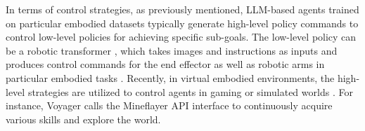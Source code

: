 In terms of control strategies, as previously mentioned, LLM-based agents trained on particular embodied datasets typically generate high-level policy commands to control low-level policies for achieving specific sub-goals. The low-level policy can be a robotic transformer \cite{DBLP:conf/icml/DriessXSLCIWTVY23, DBLP:journals/corr/abs-2212-06817, DBLP:journals/corr/abs-2307-15818}, which takes images and instructions as inputs and produces control commands for the end effector as well as robotic arms in particular embodied tasks \cite{DBLP:conf/corl/IchterBCFHHHIIJ22}. Recently, in virtual embodied environments, the high-level strategies are utilized to control agents in gaming \cite{DBLP:journals/corr/abs-2305-17144,DBLP:journals/corr/abs-2302-01560, DBLP:journals/corr/abs-2305-16291, DBLP:conf/nips/FanWJMYZTHZA22} or simulated worlds \cite{DBLP:journals/corr/abs-2304-03442, DBLP:journals/corr/abs-2303-17760, DBLP:journals/corr/abs-2307-07924}. For instance, Voyager \cite{DBLP:journals/corr/abs-2305-16291} calls the Mineflayer \cite{Mineflayer-JavaScript-2013} API interface to continuously acquire various skills and explore the world.



